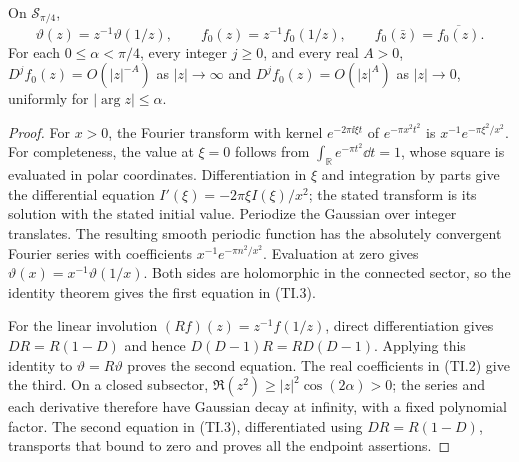 \begin{lemma}
On $\mathcal S_{\pi/4}$,
\begin{equation}
 \vartheta(z)=z^{-1}\vartheta(1/z),\qquad
 f_0(z)=z^{-1}f_0(1/z),\qquad
 f_0(\bar z)=\overline{f_0(z)}. \tag{TI.3}
\end{equation}
For each $0\le\alpha<\pi/4$, every integer $j\ge0$, and every real
$A>0$, $D^jf_0(z)=O(|z|^{-A})$ as $|z|\to\infty$ and
$D^jf_0(z)=O(|z|^A)$ as $|z|\to0$, uniformly for $|\arg z|\le\alpha$.
\end{lemma}
\begin{proof}
For $x>0$, the Fourier transform with kernel $e^{-2\pi\ii\xi t}$
of $e^{-\pi x^2t^2}$ is $x^{-1}e^{-\pi\xi^2/x^2}$.
For completeness, the value at $\xi=0$ follows from
$\int_{\mathbb R}e^{-\pi t^2}\dd t=1$, whose square is evaluated in
polar coordinates. Differentiation in $\xi$ and integration by parts
give the differential equation $I'(\xi)=-2\pi\xi I(\xi)/x^2$;
the stated transform is its solution with the stated initial value.
Periodize the Gaussian over integer translates. The resulting smooth
periodic function has the absolutely convergent Fourier series with
coefficients $x^{-1}e^{-\pi n^2/x^2}$. Evaluation at zero gives
$\vartheta(x)=x^{-1}\vartheta(1/x)$. Both sides are holomorphic in
the connected sector, so the identity theorem gives the first equation
in (TI.3).

For the linear involution $(Rf)(z)=z^{-1}f(1/z)$, direct differentiation
gives $DR=R(1-D)$ and hence $D(D-1)R=RD(D-1)$. Applying this identity
to $\vartheta=R\vartheta$ proves the second equation. The real
coefficients in (TI.2) give the third. On a closed subsector,
$\Re(z^2)\ge |z|^2\cos(2\alpha)>0$; the series and each derivative
therefore have Gaussian decay at infinity, with a fixed polynomial
factor. The second equation in (TI.3), differentiated using $DR=R(1-D)$,
transports that bound to zero and proves all the endpoint assertions.
\end{proof}

